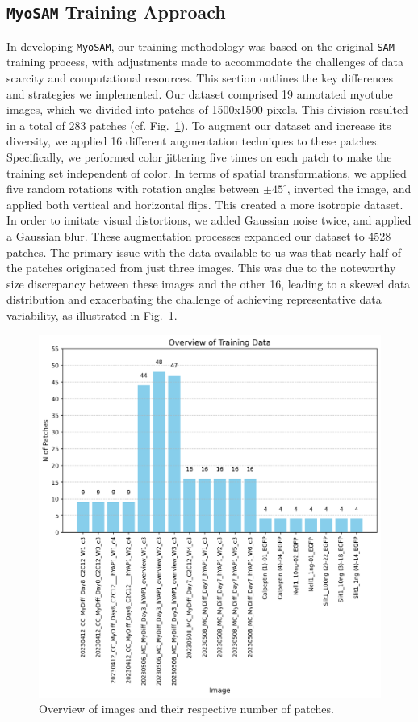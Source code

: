 \subsection{\texttt{MyoSAM} Training Approach}
In developing \texttt{MyoSAM}, our training methodology was based on the original \texttt{SAM} training process, with adjustments made to accommodate the challenges of data scarcity and computational resources. This section outlines the key differences and strategies we implemented.
Our dataset comprised 19 annotated myotube images, which we divided into patches of 1500x1500 pixels. This division resulted in a total of 283 patches (cf. Fig.~\ref{figtraindata}). To augment our dataset and increase its diversity, we applied 16 different augmentation techniques to these patches. Specifically, we performed color jittering five times on each patch to make the training set independent of color. In terms of spatial transformations, we applied five random rotations with rotation angles between $\pm 45^{\circ}$, inverted the image, and applied both vertical and horizontal flips. This created a more isotropic dataset. In order to imitate visual distortions, we added Gaussian noise twice, and applied a Gaussian blur. These augmentation processes expanded our dataset to 4528 patches. The primary issue with the data available to us was that nearly half of the patches originated from just three images. This was due to the noteworthy size discrepancy between these images and the other 16, leading to a skewed data distribution and exacerbating the challenge of achieving representative data variability, as illustrated in Fig.~\ref{figtraindata}.

\begin{figure}
	\centering
	\includegraphics[width=\textwidth]{"images/overview_training_data.png"}
	\caption[Patches per image]{Overview of images and their respective number of patches.}
	\label{figtraindata}
\end{figure}

